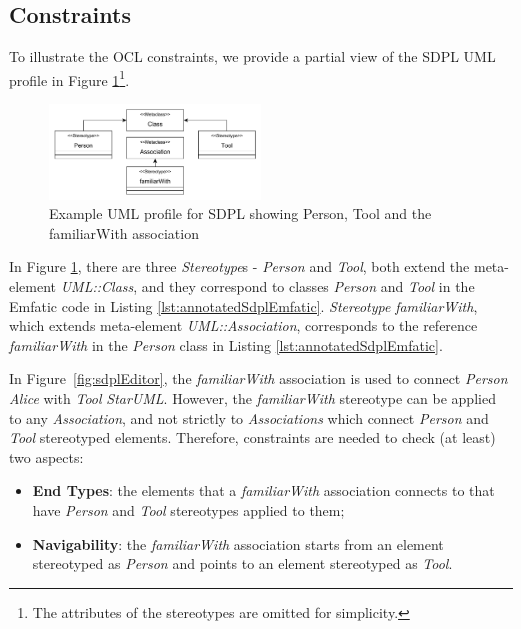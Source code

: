 \subsection{Constraints}
\label{sec:constraints}

To illustrate the OCL constraints, we provide a partial view of the SDPL UML profile in Figure \ref{fig:sample_profile}\footnote{The attributes of the stereotypes are omitted for simplicity.}.

\begin{figure}[ht!]
	\centering
	\includegraphics[width=0.5\textwidth]{diagrams/example_profile}
	\caption[]{Example UML profile for SDPL showing Person, Tool and the familiarWith association}
	\label{fig:sample_profile}
\end{figure}

In Figure \ref{fig:sample_profile}, there are three \emph{Stereotype}s - 
\emph{Person} and \emph{Tool}, both extend the meta-element \emph{UML::Class}, 
and they correspond to classes \emph{Person} and \emph{Tool} in the Emfatic 
code in Listing \ref{lst:annotatedSdplEmfatic}. \emph{Stereotype} 
\emph{familiarWith}, which extends meta-element \emph{UML::Association}, 
corresponds to the reference \emph{familiarWith} in the \emph{Person} class in 
Listing \ref{lst:annotatedSdplEmfatic}.

%

In Figure~\ref{fig:sdplEditor}, the \textit{familiarWith} association is used 
to connect \textit{Person} \emph{Alice} with \textit{Tool} \emph{StarUML}. However, 
the \emph{familiarWith} stereotype can be applied to any \emph{Association}, 
and not strictly to \emph{Associations} which connect \emph{Person} and 
\emph{Tool} stereotyped elements. Therefore, constraints are needed to check 
(at least) two aspects:

\begin{itemize}
	\item \textbf{End Types}: the elements that a \emph{familiarWith} association connects to that have \emph{Person} and \emph{Tool} stereotypes applied to them;
	\item \textbf{Navigability}: the \emph{familiarWith} association starts from an element stereotyped as \emph{Person} and points to an element stereotyped as \emph{Tool}.
\end{itemize}

